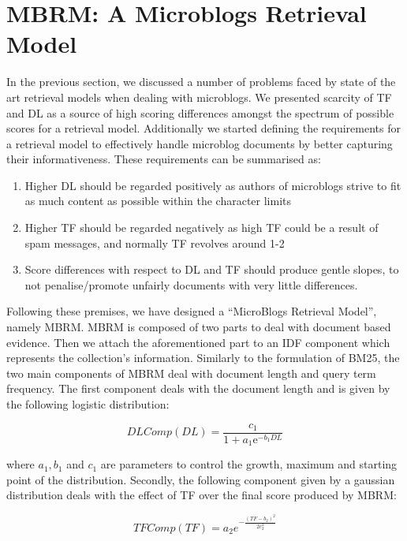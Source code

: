 \section{MBRM: A Microblogs Retrieval Model}
\label{MBRM-section}
In the previous section, we discussed a number of problems faced by state of the art retrieval models when dealing with microblogs. We presented scarcity of TF and DL as a source of high scoring differences amongst the spectrum of possible scores for a retrieval model. Additionally we started defining the requirements for a retrieval model to effectively handle microblog documents by better capturing their informativeness. These requirements can be summarised as: 

\begin{enumerate}
\item Higher DL should be regarded positively as authors of microblogs strive to fit as much content as possible within the character limits
\item Higher TF should be regarded negatively as high TF could be a result of spam messages, and normally TF revolves around 1-2
\item Score differences with respect to DL and TF should produce gentle slopes, to not penalise/promote unfairly documents with very little differences.
\end{enumerate}

Following these premises, we have designed a ``MicroBlogs Retrieval Model'', namely MBRM. MBRM is composed of two parts to deal with document based evidence. Then we attach the aforementioned part to an IDF component which represents the collection's information. Similarly to the formulation of BM25, the two main components of MBRM deal with document length and query term frequency. The first component deals with the document length and is given by the following logistic distribution:

\begin{equation}
DLComp(DL)={\frac  {c_1}{1+{a_1\mathrm  e}^{{-b_1DL}}}}
\end{equation}

where \(a_1, b_1\) and \(c_1\) are parameters to control the growth, maximum and starting point of the distribution. Secondly, the following component given by a gaussian distribution deals with the effect of TF over the final score produced by MBRM:

\begin{equation}
TFComp\left(TF\right)=a_2e^{-{\frac {(TF-b_2)^{2}}{2c_2^{2}}}}
\end{equation}

